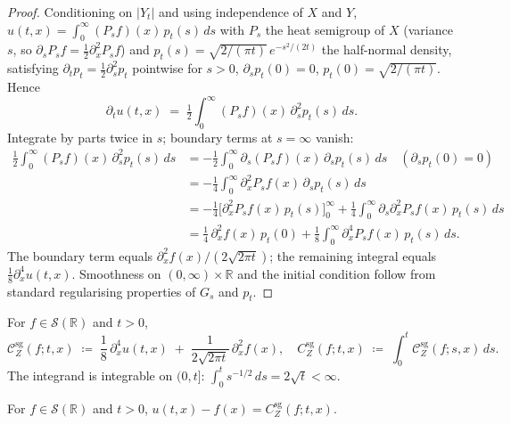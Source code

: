\documentclass[EJP]{ejpecp}
\newcommand{\R}{\mathbb{R}}
\newcommand{\IBM}{Z}
\begin{document}
\begin{proof}
Conditioning on $|Y_t|$ and using independence of $X$ and $Y$,
$u(t,x)=\int_0^\infty(P_s f)(x)\,p_t(s)\,ds$ with $P_s$ the heat
semigroup of $X$ (variance $s$, so
$\partial_s P_s f=\tfrac12\partial_x^{2}P_s f$) and
$p_t(s)=\sqrt{2/(\pi t)}\,e^{-s^{2}/(2t)}$ the half-normal density,
satisfying $\partial_t p_t=\tfrac12\partial_s^{2}p_t$ pointwise for
$s>0$, $\partial_s p_t(0)=0$, $p_t(0)=\sqrt{2/(\pi t)}$. Hence
\[
  \partial_t u(t,x)
  \;=\;\tfrac12\!\int_0^\infty\!(P_s f)(x)\,\partial_s^{2}p_t(s)\,ds.
\]
Integrate by parts twice in $s$; boundary terms at $s=\infty$ vanish:
\[
\begin{aligned}
  \tfrac12\!\int_0^\infty\!(P_s f)(x)\,\partial_s^{2}p_t(s)\,ds
  &= -\tfrac12\!\int_0^\infty\!\partial_s(P_s f)(x)\,\partial_s p_t(s)\,ds
   \quad(\partial_s p_t(0)=0)\\
  &= -\tfrac14\!\int_0^\infty\!\partial_x^{2}P_s f(x)\,\partial_s p_t(s)\,ds\\
  &= -\tfrac14\bigl[\partial_x^{2}P_s f(x)\,p_t(s)\bigr]_0^\infty
   +\tfrac14\!\int_0^\infty\!\partial_s\partial_x^{2}P_s f(x)\,p_t(s)\,ds\\
  &= \tfrac14\,\partial_x^{2}f(x)\,p_t(0)
   +\tfrac18\!\int_0^\infty\!\partial_x^{4}P_s f(x)\,p_t(s)\,ds.
\end{aligned}
\]
The boundary term equals
$\partial_x^{2}f(x)/(2\sqrt{2\pi t})$; the remaining integral equals
$\tfrac18\partial_x^{4}u(t,x)$. Smoothness on
$(0,\infty)\times\R$ and the initial condition follow from
standard regularising properties of $G_s$ and $p_t$.
\end{proof}

\begin{definition}
\label{def:sg-correction}
For $f\in\mathscr S(\R)$ and $t>0$,
\begin{equation}\label{eq:sg-density}
  \mathcal C_\IBM^{\mathrm{sg}}(f;t,x)
  \;\coloneqq\;\frac{1}{8}\,\partial_x^{4}u(t,x)
   \;+\;\frac{1}{2\sqrt{2\pi t}}\,\partial_x^{2}f(x),
  \quad
  C_\IBM^{\mathrm{sg}}(f;t,x)
  \;\coloneqq\;\int_0^t\mathcal C_\IBM^{\mathrm{sg}}(f;s,x)\,ds.
\end{equation}
The integrand is integrable on $(0,t]$:
$\int_0^t s^{-1/2}\,ds=2\sqrt t<\infty$.
\end{definition}

\begin{corollary}\label{cor:sg-integrated}
For $f\in\mathscr S(\R)$ and $t>0$,
$u(t,x)-f(x)=C_\IBM^{\mathrm{sg}}(f;t,x)$.
\end{corollary}
\end{document}
